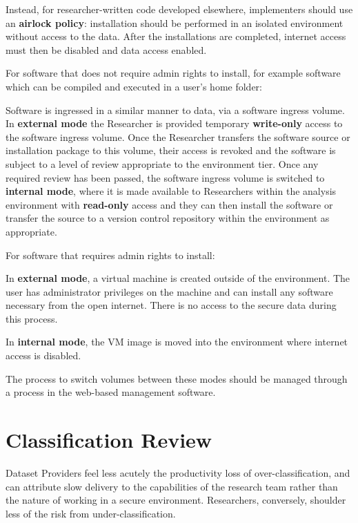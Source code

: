 \documentclass[10pt,a4paper,twocolumn]{article}
\begin{document}
Instead, for researcher-written code developed elsewhere, implementers should use an \textbf{airlock policy}: installation should be performed in an isolated environment without access to the data. After the installations are completed, internet access must then be disabled and data access enabled. 

For software that does not require admin rights to install, for example software which can be compiled and executed in a user's home folder:

Software is ingressed in a similar manner to data, via a software ingress volume. In \textbf{external mode} the Researcher is provided temporary \textbf{write-only} access to the software ingress volume. Once the Researcher transfers the software source or installation package to this volume, their access is revoked and the software is subject to a level of review appropriate to the environment tier. Once any required review has been passed, the software ingress volume is switched to \textbf{internal mode}, where it is made available to Researchers within the analysis environment with \textbf{read-only} access and they can then install the software or transfer the source to a version control repository within the environment as appropriate.

For software that requires admin rights to install:

In \textbf{external mode}, a virtual machine is created outside of the environment. The user has administrator privileges on the machine and can install any software necessary from the open internet. There is no access to the secure data during this process.

In \textbf{internal mode}, the VM image is moved into the environment where internet access is disabled. 

The process to switch volumes between these modes should be managed through a process in the web-based management software.

\section{Classification Review}
\label{sec:review}

Dataset Providers feel less acutely the productivity loss of over-classification, and can attribute slow delivery to the capabilities of the research team rather than the nature of working in a secure environment. Researchers, conversely, shoulder less of the risk from under-classification. 
\end{document}
